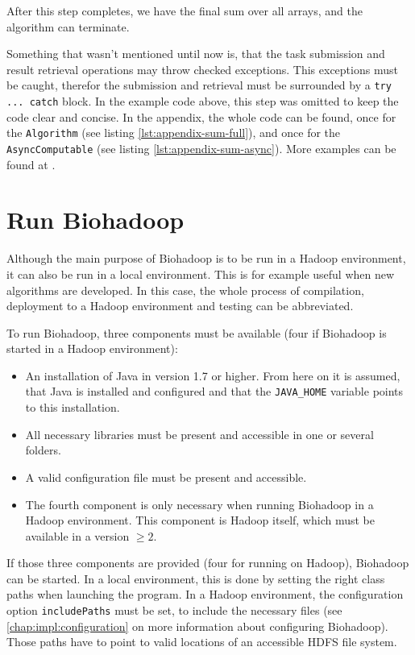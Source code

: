   After this step completes, we have the final sum over all arrays, and the algorithm can terminate.
  
  Something that wasn't mentioned until now is, that the task submission and result retrieval operations may throw checked exceptions. This exceptions must be caught, therefor the submission and retrieval must be surrounded by a \texttt{try ... catch} block. In the example code above, this step was omitted to keep the code clear and concise. In the appendix, the whole code can be found, once for the \texttt{Algorithm} (see listing \ref{lst:appendix-sum-full}), and once for the \texttt{AsyncComputable} (see listing \ref{lst:appendix-sum-async}). More examples can be found at \cite{biohadoop-algorithms}.
  
\section{Run Biohadoop}
\label{chap:usage:run}
Although the main purpose of Biohadoop is to be run in a Hadoop environment, it can also be run in a local environment. This is for example useful when new algorithms are developed. In this case, the whole process of compilation, deployment to a Hadoop environment and testing can be abbreviated.

To run Biohadoop, three components must be available (four if Biohadoop is started in a Hadoop environment):

\begin{itemize}
  \item An installation of Java in version 1.7 or higher. From here on it is assumed, that Java is installed and configured and that the \texttt{JAVA\_HOME} variable points to this installation.
  \item All necessary libraries must be present and accessible in one or several folders.
  \item A valid configuration file must be present and accessible.
  \item The fourth component is only necessary when running Biohadoop in a Hadoop environment. This component is Hadoop itself, which must be available in a version $\geq 2$.
\end{itemize}

If those three components are provided (four for running on Hadoop), Biohadoop can be started. In a local environment, this is done by setting the right class paths when launching the program. In a Hadoop environment, the configuration option \texttt{includePaths} must be set, to include the necessary files (see \ref{chap:impl:configuration} on more information about configuring Biohadoop). Those paths have to point to valid locations of an accessible HDFS file system.

